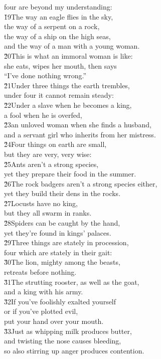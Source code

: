 \begin{poetry}
\poemll    four are beyond my understanding: \\
\poeml \v{19}The way an eagle flies in the sky, \\
\poemll    the way of a serpent on a rock, \\
\poeml the way of a ship on the high seas, \\
\poemll    and the way of a man with a young woman. \\
\poeml \v{20}This is what an immoral woman is like: \\
\poemll    she eats, wipes her mouth, then says \\
\poemlll       ``I've done nothing wrong.'' \\
\poeml \v{21}Under three things the earth trembles, \\
\poemll    under four it cannot remain steady: \\
\poeml \v{22}Under a slave when he becomes a king, \\
\poemll    a fool when he is overfed, \\
\poeml \v{23}an unloved woman when she finds a husband, \\
\poemll    and a servant girl who inherits from her mistress. \\
\poeml \v{24}Four things on earth are small, \\
\poemll    but they are very, very wise: \\
\poeml \v{25}Ants aren't a strong species, \\
\poemll    yet they prepare their food in the summer. \\
\poeml \v{26}The rock badgers aren't a strong species either, \\
\poemll    yet they build their dens in the rocks. \\
\poeml \v{27}Locusts have no king, \\
\poemll    but they all swarm in ranks. \\
\poeml \v{28}Spiders can be caught by the hand, \\
\poemll    yet they're found in kings' palaces. \\
\poeml \v{29}Three things are stately in procession, \\
\poemll    four which are stately in their gait: \\
\poeml \v{30}The lion, mighty among the beasts, \\
\poemll    retreats before nothing. \\
\poeml \v{31}The strutting rooster, as well as the goat, \\
\poemll    and a king with his army. \\
\poeml \v{32}If you've foolishly exalted yourself \\
\poemll    or if you've plotted evil, \\
\poemlll       put your hand over your mouth. \\
\poeml \v{33}Just as whipping milk produces butter, \\
\poemll    and twisting the nose causes bleeding, \\
\poemlll       so also stirring up anger produces contention.
\end{poetry}
